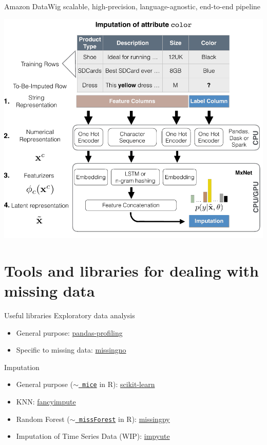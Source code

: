 \documentclass[aspectratio=43]{beamer}
\begin{document}
\begin{frame}{Amazon DataWig}
\small scalable, high-precision, language-agnostic, end-to-end pipeline

\centering\includegraphics[width=0.7\paperwidth]{datawig}
\end{frame}

\section{Tools and libraries for dealing with missing data}

\begin{frame}{Useful libraries}
Exploratory data analysis
\begin{itemize}
\item General purpose: \href{https://github.com/pandas-profiling/pandas-profiling}{pandas-profiling}
\item Specific to missing data: \href{https://github.com/ResidentMario/missingno}{missingno}
\end{itemize}
Imputation
\begin{itemize}
\item General purpose ($\sim$\href{https://cran.r-project.org/web/packages/mice/mice.pdf}{\texttt{ mice}} in R): \href{https://scikit-learn.org/stable/modules/impute.html}{scikit-learn}
\item KNN: \href{https://github.com/iskandr/fancyimpute}{fancyimpute}
\item Random Forest ($\sim$\href{https://cran.r-project.org/web/packages/missForest/missForest.pdf}{\texttt{ missForest}} in R): \href{https://github.com/epsilon-machine/missingpy}{missingpy}
\item Imputation of Time Series Data (WIP): \href{https://github.com/eltonlaw/impyute}{impyute}
\end{itemize}
\end{frame}
\end{document}

